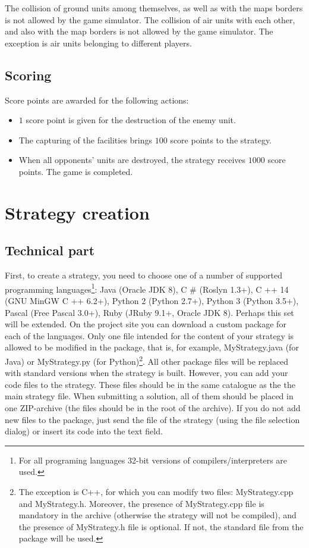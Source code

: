 The collision of ground units among themselves, as well as with the maps borders is not allowed by the game simulator. The collision of air units with each other, and
also with the map borders is not allowed by the game simulator. The exception is air units belonging to different players.

\section{Scoring}

Score points are awarded for the following actions:
\begin{itemize}
    \item $1$ score point is given for the destruction of the enemy unit.
    \item The capturing of the facilities brings $100$ score points to the strategy.
    \item When all opponents’ units are destroyed, the strategy receives $1000$ score points. The game is completed.
\end{itemize}

\chapter{Strategy creation}

\section{Technical part}

First, to create a strategy, you need to choose one of a number of supported programming languages\footnote [4] {For all programing languages
32-bit versions of compilers/interpreters are used.}: Java (Oracle JDK 8), C \# (Roslyn 1.3+), C ++ 14 (GNU MinGW C ++
6.2+), Python 2 (Python 2.7+), Python 3 (Python 3.5+), Pascal (Free Pascal 3.0+), Ruby (JRuby 9.1+, Oracle JDK 8). Perhaps this set
will be extended. On the project site you can download a custom package for each of the languages. Only one file intended for the content of your strategy is allowed to be modified in the package,
that is, for example, MyStrategy.java (for Java) or MyStrategy.py (for
Python)\footnote [5]{The exception is C++, for which you can modify two files: MyStrategy.cpp and MyStrategy.h. Moreover, the presence of
MyStrategy.cpp file is mandatory in the archive (otherwise the strategy will not be compiled), and the presence of MyStrategy.h file is optional.
 If not, the standard file from the package will be used.}. All other package files will be replaced with standard versions when the strategy is built. However, you can add your code files to the strategy. These files should be in the same catalogue as the
the main strategy file. When submitting a solution, all of them should be placed in one ZIP-archive (the files should be in the root of the archive). If
you do not add new files to the package, just send the file of the strategy (using the file selection dialog) or insert its code into the text field.

